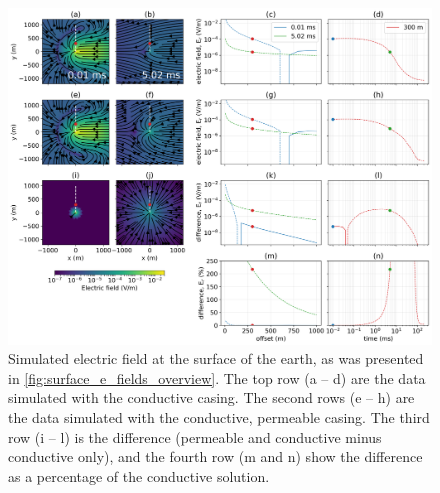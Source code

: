 \begin{figure}
    \begin{center}
    \includegraphics[width=\textwidth]{figures/em_casing/surface_e_fields_permeable.png}
    \end{center}
\caption{
    Simulated electric field at the surface of the earth, as was presented in \ref{fig:surface_e_fields_overview}.
    The top row (a -- d) are the data simulated with the conductive casing. The second rows (e -- h) are the data
    simulated with the conductive, permeable casing. The third row (i -- l) is the difference (permeable and conductive minus conductive only),
    and the fourth row (m and n) show the difference as a percentage of the conductive solution.
}
\label{fig:surface_e_fields_permeable}
\end{figure}



